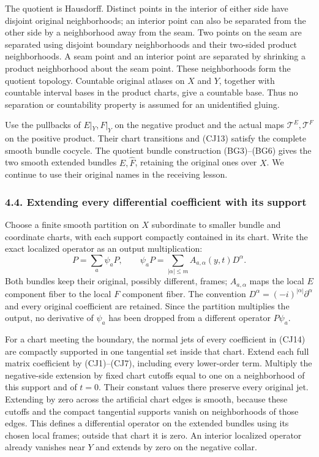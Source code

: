 \documentclass[
  11pt,
]{article}
\begin{document}
The quotient is Hausdorff. Distinct points in the interior of either
side have disjoint original neighborhoods; an interior point can also be
separated from the other side by a neighborhood away from the seam. Two
points on the seam are separated using disjoint boundary neighborhoods
and their two-sided product neighborhoods. A seam point and an interior
point are separated by shrinking a product neighborhood about the seam
point. These neighborhoods form the quotient topology. Countable
original atlases on \(X\) and \(Y\), together with countable interval
bases in the product charts, give a countable base. Thus no separation
or countability property is assumed for an unidentified gluing.

Use the pullbacks of \(E|_Y,F|_Y\) on the negative product and the
actual maps \(\mathcal T^E,\mathcal T^F\) on the positive product. Their
chart transitions and (CJ13) satisfy the complete smooth bundle cocycle.
The quotient bundle construction (BG3)--(BG6) gives the two smooth
extended bundles \(\widehat E,\widehat F\), retaining the original ones
over \(X\). We continue to use their original names in the receiving
lesson.

\subsubsection{4.4. Extending every differential coefficient with its
support}\label{extending-every-differential-coefficient-with-its-support}

Choose a finite smooth partition on \(X\) subordinate to smaller bundle
and coordinate charts, with each support compactly contained in its
chart. Write the exact localized operator as an output multiplication:
\[
 P=\sum_a\psi_a P,\qquad
 \psi_a P=\sum_{|\alpha|\leq m}A_{a,\alpha}(y,t)D^\alpha .
 \tag{CJ14}
\] Both bundles keep their original, possibly different, frames;
\(A_{a,\alpha}\) maps the local \(E\) component fiber to the local \(F\)
component fiber. The convention
\(D^\alpha=(-i)^{|\alpha|}\partial^\alpha\) and every original
coefficient are retained. Since the partition multiplies the output, no
derivative of \(\psi_a\) has been dropped from a different operator
\(P\psi_a\).

For a chart meeting the boundary, the normal jets of every coefficient
in (CJ14) are compactly supported in one tangential set inside that
chart. Extend each full matrix coefficient by (CJ1)--(CJ7), including
every lower-order term. Multiply the negative-side extension by fixed
chart cutoffs equal to one on a neighborhood of this support and of
\(t=0\). Their constant values there preserve every original jet.
Extending by zero across the artificial chart edges is smooth, because
these cutoffs and the compact tangential supports vanish on
neighborhoods of those edges. This defines a differential operator on
the extended bundles using its chosen local frames; outside that chart
it is zero. An interior localized operator already vanishes near \(Y\)
and extends by zero on the negative collar.
\end{document}
